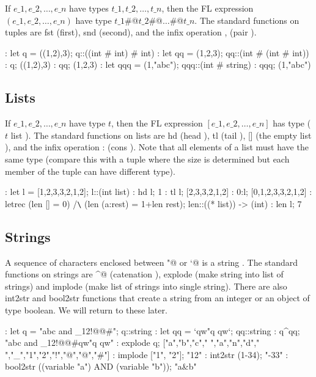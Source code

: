 If $e\_1, e\_2, \ldots , e\_n$ have types $t\_1, t\_2, \ldots , t\_n$, then
the FL expression $(e\_1, e\_2, \ldots , e\_n)$ have type
$t\_1$\verb@#@$t\_2$\verb@#@$\ldots$\verb@#@$t\_n$.
The standard functions on tuples are fst%
%
{} (first), snd%
%
{} (second), and the infix
operation , (pair%
%
{}).
\begin{hol}
: let q = ((1,2),3);
q::((int # int) # int)
: let qq = (1,2,3);
qq::(int # (int # int))
: q;
((1,2),3)
: qq;
(1,2,3)
: let qqq = (1,"abc");
qqq::(int # string)
: qqq;
(1,"abc")
\end{hol}

\subsection{Lists}

If $e\_1, e\_2, \ldots , e\_n$ have type $t$, then the FL expression
$[e\_1, e\_2, \ldots , e\_n]$ has type ($t$ list%
%
{}).
The standard functions on lists are hd%
%
{} (head%
%
{}), tl%
%
{} (tail%
%
{}), []%
\index{[]}%
{} (the empty list%
%
{}), and the infix operation : (cons%
%
{}).
Note that all elements of a list must have the same type (compare
this with a tuple where the size is determined but each member of
the tuple can have different type).
\begin{hol}
: let l = [1,2,3,3,2,1,2];
l::(int list)
: hd l;
1
: tl l;
[2,3,3,2,1,2]
: 0:l;
[0,1,2,3,3,2,1,2]
: letrec (len [] = 0) /\verb!\! (len (a:rest) = 1+len rest);
len::((* list)) -> (int)
: len l;
7
\end{hol}

\subsection{Strings}

A sequence of characters enclosed between \verb@"@ or \verb@`@ is a string%
%
{}.
The standard functions on strings are \verb@^@ (catenation%
%
{}), explode%
%
{}
(make string into list of strings) and
implode%
%
{} (make list of strings into single string).
There are also int2str%
%
{} and bool2str%
%
{} functions that create a string
from an integer or an object of type boolean.
We will return to these later.
\begin{hol}
: let q = "abc and \_12!@@#";
q::string
: let qq = `qw"q qw`;
qq::string
: q^qq;
"abc and \_12!@@#qw"q qw"
: explode q;
["a","b","c"," ","a","n","d"," ","\_","1","2","!","@","@","#"]
: implode ["1", "2"];
"12"
: int2str (1-34);
"-33"
: bool2str ((variable "a") AND (variable "b"));
"a&b"
\end{hol}

